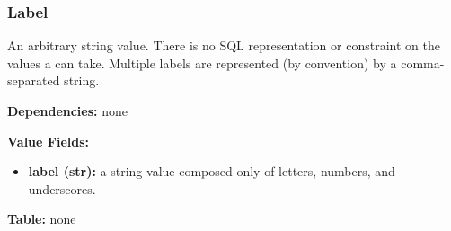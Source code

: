 \subsubsection{Label}
\label{unit:Label}

An arbitrary string value.  There is no SQL representation or
constraint on the values a  can take.  Multiple labels
are represented (by convention) by a comma-separated string.

\textbf{Dependencies:} none

\textbf{Value Fields:}
\begin{itemize}
  \item \textbf{label (str):}
      a string value composed only of letters, numbers, and underscores.
\end{itemize}

\textbf{Table:} none
